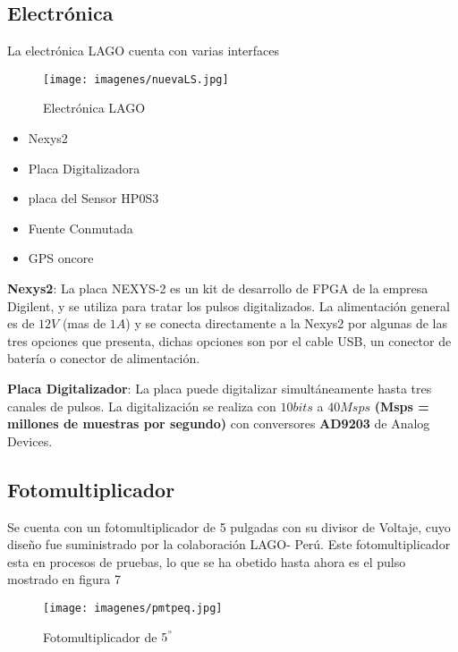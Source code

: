 \documentclass[spanish,notitlepage,letterpaper,12pt]{article} %
\begin{document}
 \subsection{Electrónica} 
 
 La electrónica LAGO cuenta con varias interfaces \\
   
     \begin{figure}[htp!]
     \centering
     \texttt{[image: imagenes/nuevaLS.jpg]}
     \caption{Electrónica LAGO}
     \end{figure}  
   
    \begin{itemize}
     \item Nexys2      
     \item Placa Digitalizadora
     \item placa del Sensor HP0S3 
     \item Fuente Conmutada
     \item GPS oncore
    \end{itemize}


    \textbf{ Nexys2}:
     La placa NEXYS-2 es un kit de desarrollo de FPGA de la empresa Digilent, y se utiliza para
     tratar los pulsos digitalizados.
     La alimentación general es de $12V$ (mas de $1 A$) y se conecta directamente a la Nexys2 por algunas de las tres opciones 
     que presenta, dichas opciones son por el cable USB, un conector de batería o conector de alimentación.\,\cite{LAGOOfficial}
 
    \textbf{ Placa Digitalizador}: 
     La placa puede digitalizar simultáneamente hasta tres canales de pulsos. La digitalización se
     realiza con $10bits$ a $40Msps$ \textbf{(Msps = millones de muestras por segundo)} con conversores \textbf{AD9203} de
     Analog Devices.\,\cite{LAGOOfficial}

  \newpage   
  \subsection{Fotomultiplicador} Se cuenta con un fotomultiplicador de 5 pulgadas con su divisor de Voltaje, cuyo diseño fue suministrado
   por la colaboración LAGO- Perú. Este fotomultiplicador esta en procesos de pruebas, lo que se ha obetido hasta ahora es el pulso mostrado
   en figura 7
  
  \begin{figure}[htp!]
     \centering
     \texttt{[image: imagenes/pmtpeq.jpg]}
     \caption{Fotomultiplicador de $5^{"}$}
     \end{figure}  
  
\end{document}
